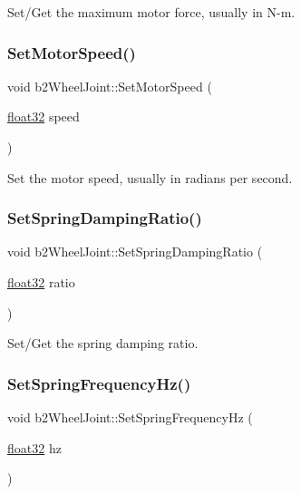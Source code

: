 Set/\+Get the maximum motor force, usually in N-\/m. 

\mbox{\label{classb2_wheel_joint_a6e3255fcf5c82b979ad7e3dc1c089c0b}} 
\subsubsection{\texorpdfstring{SetMotorSpeed()}{SetMotorSpeed()}}
{\footnotesize\ttfamily void b2\+Wheel\+Joint\+::\+Set\+Motor\+Speed (\begin{DoxyParamCaption}\item[{\mbox{\hyperlink{b2_settings_8h_aacdc525d6f7bddb3ae95d5c311bd06a1}{float32}}}]{speed }\end{DoxyParamCaption})}



Set the motor speed, usually in radians per second. 

\mbox{\label{classb2_wheel_joint_a39b123ac045c8ec93faa65746e6655dc}} 
\subsubsection{\texorpdfstring{SetSpringDampingRatio()}{SetSpringDampingRatio()}}
{\footnotesize\ttfamily void b2\+Wheel\+Joint\+::\+Set\+Spring\+Damping\+Ratio (\begin{DoxyParamCaption}\item[{\mbox{\hyperlink{b2_settings_8h_aacdc525d6f7bddb3ae95d5c311bd06a1}{float32}}}]{ratio }\end{DoxyParamCaption})\hspace{0.3cm}{\ttfamily [inline]}}



Set/\+Get the spring damping ratio. 

\mbox{\label{classb2_wheel_joint_af9f8fada5cb30f83aa2fbf486e9d347b}} 
\subsubsection{\texorpdfstring{SetSpringFrequencyHz()}{SetSpringFrequencyHz()}}
{\footnotesize\ttfamily void b2\+Wheel\+Joint\+::\+Set\+Spring\+Frequency\+Hz (\begin{DoxyParamCaption}\item[{\mbox{\hyperlink{b2_settings_8h_aacdc525d6f7bddb3ae95d5c311bd06a1}{float32}}}]{hz }\end{DoxyParamCaption})\hspace{0.3cm}{\ttfamily [inline]}}



